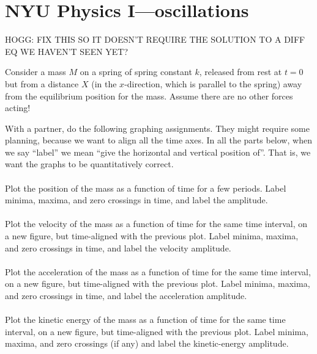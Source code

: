 \documentclass[12pt]{article}
\begin{document}
\section*{NYU Physics I---oscillations}

HOGG: FIX THIS SO IT DOESN'T REQUIRE THE SOLUTION TO A DIFF EQ WE HAVEN'T SEEN YET?

Consider a mass $M$ on a spring of spring constant $k$, released from
rest at $t=0$ but from a distance $X$ (in the $x$-direction, which is
parallel to the spring) away from the equilibrium position for the
mass.  Assume there are no other forces acting!

With a partner, do the following graphing assignments. They might
require some planning, because we want to align all the time axes.  In
all the parts below, when we say ``label'' we mean ``give the
horizontal and vertical position of''. That is, we want the graphs to
be quantitatively correct.

\paragraph{\theproblem}%
Plot the position of the mass as a function of time for a few periods.
Label minima, maxima, and zero crossings in time, and label the amplitude.

\paragraph{\theproblem}%
Plot the velocity of the mass as a function of time for the same time
interval, on a new figure, but time-aligned with the previous plot.  Label
minima, maxima, and zero crossings in time, and label the velocity amplitude.

\paragraph{\theproblem}%
Plot the acceleration of the mass as a function of time for the same time
interval, on a new figure, but time-aligned with the previous plot.  Label
minima, maxima, and zero crossings in time, and label the acceleration amplitude.

\paragraph{\theproblem}%
Plot the kinetic energy of the mass as a function of time for the same time
interval, on a new figure, but time-aligned with the previous plot.  Label
minima, maxima, and zero crossings (if any) and label the kinetic-energy amplitude.
\end{document}
